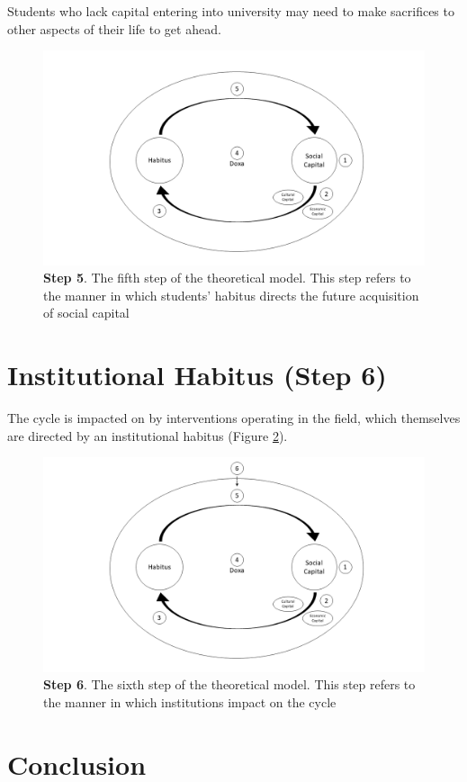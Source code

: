Students who lack capital entering into university may need to make sacrifices to other aspects of their life to get ahead. 

\begin{figure}[ht]
\centering
\includegraphics[width=\textwidth]{C5 - Understanding Capital Accumulation/HabitusSocCap_TheoreticalModel5.png}
\caption{\label{fig:TheoreticalModel5_C5}\textbf{Step 5}. The fifth step of the theoretical model. This step refers to the manner in which students' habitus directs the future acquisition of social capital}
\end{figure}



\section{Institutional Habitus (Step 6)}
The cycle is impacted on by interventions operating in the field, which themselves are directed by an institutional habitus (Figure \ref{fig:TheoreticalModel6_C5}). 

\begin{figure}[ht]
\centering
\includegraphics[width=\textwidth]{C5 - Understanding Capital Accumulation/HabitusSocCap_TheoreticalModel.png}
\caption{\label{fig:TheoreticalModel6_C5}\textbf{Step 6}. The sixth step of the theoretical model. This step refers to the manner in which institutions impact on the cycle}
\end{figure}



\section{Conclusion}


